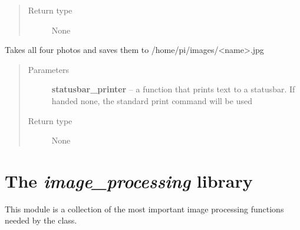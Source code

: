 \documentclass[a4paper,10pt,openany,oneside]{sphinxmanual}
\begin{document}
\begin{fulllineitems}
\begin{fulllineitems}
\begin{quote}
\begin{description}
\item[{Return type}] \leavevmode
None

\end{description}\end{quote}

\end{fulllineitems}


\begin{fulllineitems}
\label{index:scripts.measurement.measurement.takePhotos}
Takes all four photos and saves them to /home/pi/images/\textless{}name\textgreater{}.jpg
\begin{quote}\begin{description}
\item[{Parameters}] \leavevmode
\textbf{statusbar\_printer} -- a function that prints text to a statusbar. If handed none, the standard print command will be used

\item[{Return type}] \leavevmode
None

\end{description}\end{quote}

\end{fulllineitems}


\end{fulllineitems}



\section{The \emph{image\_processing} library}
\label{index:module-scripts.image_processing}\label{index:the-image-processing-library}
This module is a collection of the most important image processing functions
needed by the  class.
\end{document}
